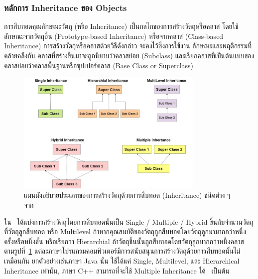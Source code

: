 \documentclass[12pt,one side,openright,a4paper]{cpe-thesis-th}
\newcommand{\thaijustify}[1]{%
  \par\hspace{30pt}\justifying
  #1
}
\begin{document}
\subsubsection{หลักการ Inheritance ของ Objects}
\thaijustify{
  การสืบทอดคุณลักษณะวัตถุ (หรือ Inheritance) เป็นกลไกของการสร้างวัตถุหรือคลาส โดยใช้ลักษณะจากวัตถุอื่น (Prototype-based Inheritance) หรือจากคลาส (Class-based Inheritance) การสร้างวัตถุหรือคลาสด้วยวิธีดังกล่าว จะคงไว้ซึ่งการใช้งาน ลักษณะและพฤติกรรมที่คล้ายคลึงกัน คลาสที่สร้างขึ้นมาจะถูกนิยามว่าคลาสย่อย (Subclass) และเรียกคลาสที่เป็นต้นแบบของคลาสย่อยว่าคลาสพื้นฐานหรือซุปเปอร์คลาส (Base Class or Superclass)~\cite{johnson88classobj}
}
\begin{figure}[H]
  \centering
  \includegraphics[width=9cm]{figure/literature/oop-inheritance.jpg}
  \caption[แผนผังอธิบายประเภทของการสร้างวัตถุด้วยการสืบทอดชนิดต่าง ๆ]{แผนผังอธิบายประเภทของการสร้างวัตถุด้วยการสืบทอด (Inheritance) ชนิดต่าง ๆ จาก~\cite{sakpal18inheritance}}
  \label{fig:oop-inheritance}
\end{figure}
\thaijustify{
  ใน~\cite{sakpal18inheritance} ได้แบ่งการสร้างวัตถุโดยการสืบทอดนั้นเป็น Single / Multiple / Hybrid ขึ้นกับจำนวนวัตถุที่วัตถุลูกสืบทอด หรือ Multilevel ถ้าหากคุณสมบัติของวัตถุถูกสืบทอดโดยวัตถุลูกมามากกว่าหนึ่งครั้งหรือหนึ่งชั้น หรือเรียกว่า Hierarchial ถ้าวัตถุชิ้นนั้นถูกสืบทอดโดยวัตถุลูกมากกว่าหนึ้งคลาส ตามรูปที่~\ref{fig:oop-inheritance} แต่ละภาษาโปรแกรมคอมพิวเตอร์มีการสนับสนุนการสร้างวัตถุด้วยการสืบทอดนั้นไม่เหมือนกัน ยกตัวอย่างเช่นภาษา Java นั้น ใช้ได้แค่ Single, Multilevel, และ Hierarchical Inheritance เท่านั้น, ภาษา C++ สามารถที่จะใช้ Multiple Inheritance ได้~\cite{stroustrup94inheritance} เป็นต้น
}
\end{document}
